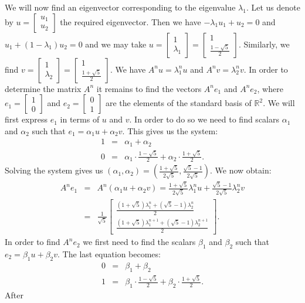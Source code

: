 \documentclass[11pt]{article}
\theoremstyle{definition}
\theoremstyle{plain}
\begin{document}
We will now find an eigenvector corresponding to the eigenvalue \( \lambda_1 \). Let us denote by \( u=\left[\begin{array}{c}u_1\\u_2\end{array}\right]\) the required eigenvector. Then we have \( -\lambda_1u_1+u_2=0 \) and \( u_1+(1-\lambda_1)u_2=0 \) and we may take \( u= \left[\begin{array}{c}1\\\lambda_1\end{array}\right]=\left[\begin{array}{c}1\\\frac{1-\sqrt 5}2\end{array}\right]\). Similarly, we find \( v= \left[\begin{array}{c}1\\\lambda_2\end{array}\right]=\left[\begin{array}{c}1\\\frac{1+\sqrt 5}2\end{array}\right]\). We have \( A^nu=\lambda_1^nu \) and \( A^nv=\lambda_2^nv \). In order to determine the matrix \( A^n \) it remains to find the vectors \( A^ne_1 \) and \( A^ne_2 \), where \( e_1=\left[\begin{array}{c}1\\0\end{array}\right]\) and \( e_2=\left[\begin{array}{c}0\\1\end{array}\right]\) are the elements of the standard basis of \( \mathbb R^2 \). We will first express \( e_1 \) in terms of \( u \) and \( v \). In order to do so we need to find scalars \( \alpha_1 \) and \( \alpha_2 \) such that \( e_1=\alpha_1u+\alpha_2v \). This gives us the system: \begin{eqnarray*} 1&=&\alpha_1+\alpha_2\\ 0&=&\alpha_1\cdot\frac{1-\sqrt 5}2+\alpha_2\cdot\frac{1+\sqrt 5}2. \end{eqnarray*} Solving the system gives us \(  (\alpha_1,\alpha_2)=\left( \frac{1+\sqrt 5}{2\sqrt 5}, \frac{\sqrt 5-1}{2\sqrt 5} \right) \). We now obtain: \begin{eqnarray*} A^ne_1&=& A^n\left(\alpha_1u+\alpha_2 v\right)=\frac{1+\sqrt 5}{2\sqrt 5}\lambda_1^nu+\frac{\sqrt 5-1}{2\sqrt 5}\lambda_2^nv\\ &=&\frac1{\sqrt 5}\left[\begin{array}{c}\frac{(1+\sqrt 5)\lambda_1^n+(\sqrt 5-1)\lambda_2^n}2\\ \frac{(1+\sqrt 5)\lambda_1^{n+1}+(\sqrt 5-1)\lambda_2^{n+1}}2 \end{array}\right]. \end{eqnarray*} In order to find \( A^ne_2 \) we first need to find the scalars \( \beta_1 \) and \( \beta_2 \) such that \( e_2=\beta_1u+\beta_2v \). The last equation becomes: \begin{eqnarray*} 0&=&\beta_1+\beta_2\\ 1&=&\beta_1\cdot\frac{1-\sqrt 5}2+\beta_2\cdot\frac{1+\sqrt 5}2. \end{eqnarray*} After 
\end{document}
